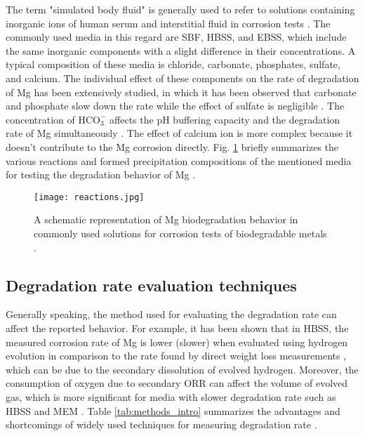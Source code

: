 The term "simulated body fluid" is generally used to refer to solutions containing inorganic ions of human serum and interstitial fluid in corrosion tests \cite{Mei2020}. The commonly used media in this regard are SBF, HBSS, and EBSS, which include the same inorganic components with a slight difference in their concentrations. A typical composition of these media is chloride, carbonate, phosphates, sulfate, and calcium. The individual effect of these components on the rate of degradation of Mg has been extensively studied, in which it has been observed that carbonate and phosphate slow down the rate while the effect of sulfate is negligible \cite{Johnston2017,Mei2019a}. The concentration of $\mathrm{HCO}_{3}^{-}$ affects the pH buffering capacity and the degradation rate of Mg simultaneously \cite{Xin2011}. The effect of calcium ion is more complex because it doesn't contribute to the Mg corrosion directly. Fig. \ref{fig:reactions_intro} briefly summarizes the various reactions and formed precipitation compositions of the mentioned media for testing the degradation behavior of Mg \cite{Mei2020}.


\begin{figure}
\centering
\medskip
\texttt{[image: reactions.jpg]}
\caption[Mg biodegradation behavior in commonly used test solutions]{A schematic representation of Mg biodegradation behavior in commonly used solutions for corrosion tests of biodegradable metals \cite{Mei2020}.} \label{fig:reactions_intro}
\end{figure}



\subsection{Degradation rate evaluation techniques}

Generally speaking, the method used for evaluating the degradation rate can affect the reported behavior. For example, it has been shown that in HBSS, the measured corrosion rate of Mg is lower (slower) when evaluated using  hydrogen evolution in comparison to the rate found by direct weight loss measurements \cite{Johnston2015,Johnston2019}, which can be due to the secondary dissolution of evolved hydrogen. Moreover, the consumption of oxygen due to secondary ORR can affect the volume of evolved gas, which is more significant for media with slower degradation rate such as HBSS and MEM \cite{Wang2020}. Table \ref{tab:methods_intro} summarizes the advantages and shortcomings of widely used techniques for measuring degradation rate \cite{Mei2020}. 



